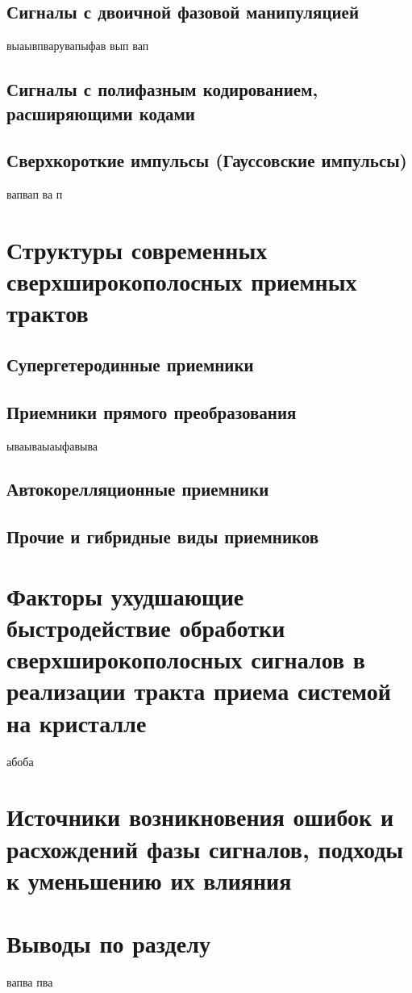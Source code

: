 \subsection{Сигналы с двоичной фазовой манипуляцией}
выаывпварувапыфав вып вап 

\subsection{Сигналы с полифазным кодированием, расширяющими кодами}

\subsection{Сверхкороткие импульсы (Гауссовские импульсы)}
вапвап ва п

\section{Структуры современных сверхширокополосных приемных трактов}

\subsection{Супергетеродинные приемники}

\subsection{Приемники прямого преобразования}
ываываыаыфавыва

\subsection{Автокорелляционные приемники}

\subsection{Прочие и гибридные виды приемников}

\section{Факторы ухудшающие быстродействие обработки сверхширокополосных сигналов в реализации тракта приема системой на кристалле}
абоба

\section{Источники возникновения ошибок и расхождений фазы сигналов, подходы к уменьшению их влияния}

\section{Выводы по разделу}
вапва пва